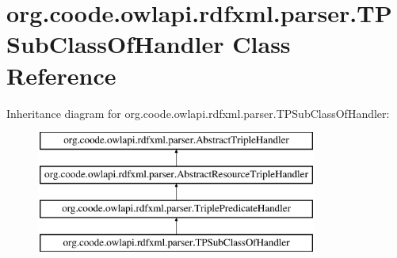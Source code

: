 \hypertarget{classorg_1_1coode_1_1owlapi_1_1rdfxml_1_1parser_1_1_t_p_sub_class_of_handler}{\section{org.\-coode.\-owlapi.\-rdfxml.\-parser.\-T\-P\-Sub\-Class\-Of\-Handler Class Reference}
\label{classorg_1_1coode_1_1owlapi_1_1rdfxml_1_1parser_1_1_t_p_sub_class_of_handler}
}
Inheritance diagram for org.\-coode.\-owlapi.\-rdfxml.\-parser.\-T\-P\-Sub\-Class\-Of\-Handler\-:\begin{figure}[H]
\begin{center}
\leavevmode
\includegraphics[height=4.000000cm]{classorg_1_1coode_1_1owlapi_1_1rdfxml_1_1parser_1_1_t_p_sub_class_of_handler}
\end{center}
\end{figure}
